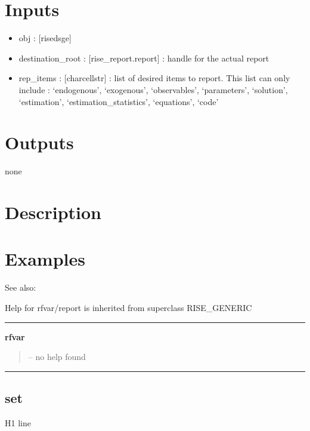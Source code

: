 \documentclass[letterpaper,10pt,english]{sphinxmanual}
\begin{document}
\section{Inputs}
\label{classes/models/@rfvar/rfvar:id105}\begin{itemize}
\item {} 
obj : {[}rise\textbar{}dsge{]}

\item {} 
destination\_root : {[}rise\_report.report{]} : handle for the actual report

\item {} 
rep\_items : {[}char\textbar{}cellstr{]} : list of desired items to report. This list
can only include : `endogenous', `exogenous', `observables',
`parameters', `solution', `estimation', `estimation\_statistics',
`equations', `code'

\end{itemize}


\section{Outputs}
\label{classes/models/@rfvar/rfvar:id106}
none


\section{Description}
\label{classes/models/@rfvar/rfvar:id107}

\section{Examples}
\label{classes/models/@rfvar/rfvar:id108}
See also:

Help for rfvar/report is inherited from superclass RISE\_GENERIC


\bigskip\hrule{}\bigskip

\label{classes/models/@rfvar/rfvar:rfvar}
\textbf{rfvar}
\begin{quote}

-- no help found
\end{quote}


\bigskip\hrule{}\bigskip



\subsection{set}
\label{classes/models/@rfvar/rfvar:id109}\label{classes/models/@rfvar/rfvar:set}
H1 line
\end{document}
